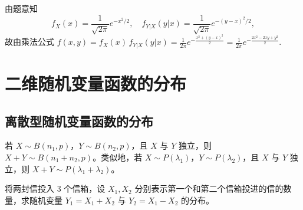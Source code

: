 \documentclass[lang=cn,11pt]{elegantbook}
\begin{document}
\begin{solution}
由题意知
\[
f_X(x) = \frac{1}{\sqrt{2\pi}}e^{-x^2/2}, \quad f_{Y|X}(y|x) = \frac{1}{\sqrt{2\pi}}e^{-(y-x)^2/2},
\]
故由乘法公式
\(
f(x,y) = f_X(x)\,f_{Y|X}(y|x) = \frac{1}{2\pi}e^{-\frac{x^2 + (y-x)^2}{2}} = \frac{1}{2\pi}e^{-\frac{2x^2 - 2xy + y^2}{2}}.
\)
\end{solution}


\section{二维随机变量函数的分布}

\subsection{离散型随机变量函数的分布}
\begin{note}
若 $X \sim B(n_1, p)$，$Y \sim B(n_2, p)$，且 $X$ 与 $Y$ 独立，则 $X + Y \sim B(n_1 + n_2, p)$。类似地，若 $X \sim P(\lambda_1)$，$Y \sim P(\lambda_2)$，且 $X$ 与 $Y$ 独立，则 $X + Y \sim P(\lambda_1 + \lambda_2)$。
\end{note}

\begin{exercise}[和与差的分布] \label{exer:3-6b}
将两封信投入 3 个信箱，设 $X_1, X_2$ 分别表示第一个和第二个信箱投进的信的数量，求随机变量 $Y_1 = X_1 + X_2$ 与 $Y_2 = X_1 - X_2$ 的分布。
\end{exercise}
\end{document}
